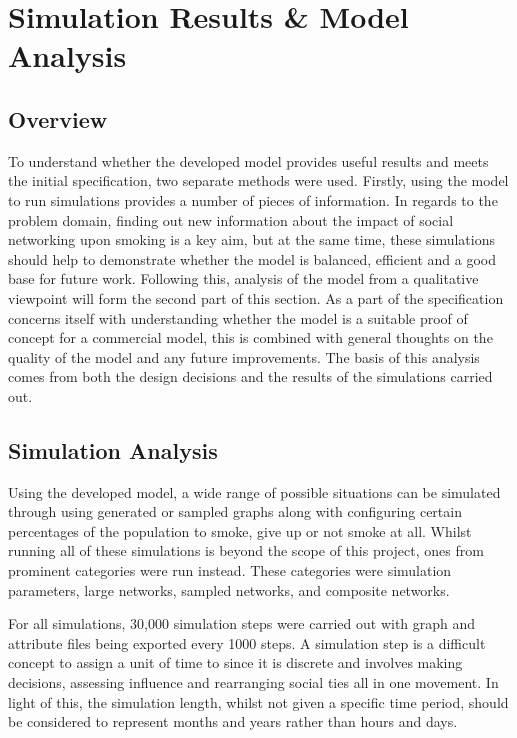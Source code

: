 \documentclass[]{report}
\begin{document}
%
%

%
%
\chapter{Simulation Results \& Model Analysis}
\label{sec:analysis}
\section{Overview}

To understand whether the developed model provides useful results and meets the initial specification, two separate methods were used. Firstly, using the model to run simulations provides a number of pieces of information. In regards to the problem domain, finding out new information about the impact of social networking upon smoking is a key aim, but at the same time, these simulations should help to demonstrate whether the model is balanced, efficient and a good base for future work. Following this, analysis of the model from a qualitative viewpoint will form the second part of this section. As a part of the specification concerns itself with understanding whether the model is a suitable proof of concept for a commercial model, this is combined with general thoughts on the quality of the model and any future improvements. The basis of this analysis comes from both the design decisions and the results of the simulations carried out.

\section{Simulation Analysis}
Using the developed model, a wide range of possible situations can be simulated through using generated or sampled graphs along with configuring certain percentages of the population to smoke, give up or not smoke at all. Whilst running all of these simulations is beyond the scope of this project, ones from prominent categories were run instead. These categories were simulation parameters, large networks, sampled networks, and composite networks.

For all simulations, 30,000 simulation steps were carried out with graph and attribute files being exported every 1000 steps. A simulation step is a difficult concept to assign a unit of time to since it is discrete and involves making decisions, assessing influence and rearranging social ties all in one movement. In light of this, the simulation length, whilst not given a specific time period, should be considered to represent months and years rather than hours and days.
\end{document}
